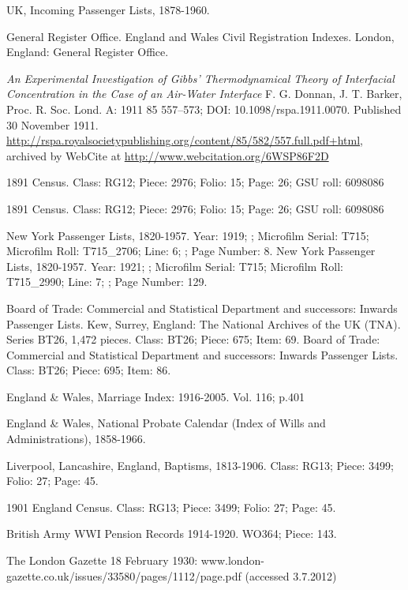 \begin{thebibliography}{99}
	UK, Incoming Passenger Lists, 1878-1960. 
	
	General Register Office. England and Wales Civil Registration Indexes. London, England: General Register Office. 

	\emph{An Experimental Investigation of Gibbs' Thermodynamical Theory of Interfacial Concentration in the Case of an Air-Water Interface}
	F. G. Donnan, J. T. Barker,
	Proc. R. Soc. Lond. A: 1911 85 557--573; DOI: 10.1098/rspa.1911.0070. Published 30 November 1911.
	\url{http://rspa.royalsocietypublishing.org/content/85/582/557.full.pdf+html},
	archived by WebCite at \url{http://www.webcitation.org/6WSP86F2D}

	 1891 Census. Class: RG12; Piece: 2976; Folio: 15; Page: 26; GSU roll: 6098086
	 
	1891 Census. Class: RG12; Piece: 2976; Folio: 15; Page: 26; GSU roll: 6098086
	
	New York Passenger Lists, 1820-1957.
	Year: 1919; ; Microfilm Serial: T715; Microfilm Roll: T715\_2706; Line: 6; ; Page Number: 8.
	New York Passenger Lists, 1820-1957.
	Year: 1921; ; Microfilm Serial: T715; Microfilm Roll: T715\_2990; Line: 7; ; Page Number: 129.
	
	Board of Trade: Commercial and Statistical Department and successors: Inwards Passenger Lists. Kew, Surrey, England: The National Archives of the UK (TNA). Series BT26, 1,472 pieces.
	Class: BT26; Piece: 675; Item: 69.
	Board of Trade: Commercial and Statistical Department and successors: Inwards Passenger Lists.
	Class: BT26; Piece: 695; Item: 86.
	
	England \& Wales, Marriage Index: 1916-2005. Vol. 116; p.401

	 England \& Wales, National Probate Calendar (Index of Wills and Administrations), 1858-1966. 
	
	Liverpool, Lancashire, England, Baptisms, 1813-1906.
	Class: RG13; Piece: 3499; Folio: 27; Page: 45.
	
	1901 England Census.
	Class: RG13; Piece: 3499; Folio: 27; Page: 45.
	
	British Army WWI Pension Records 1914-1920.  WO364; Piece: 143.
	
	 The London Gazette 18 February 1930: www.london-gazette.co.uk/issues/33580/pages/1112/page.pdf (accessed 3.7.2012)



\end{thebibliography}
